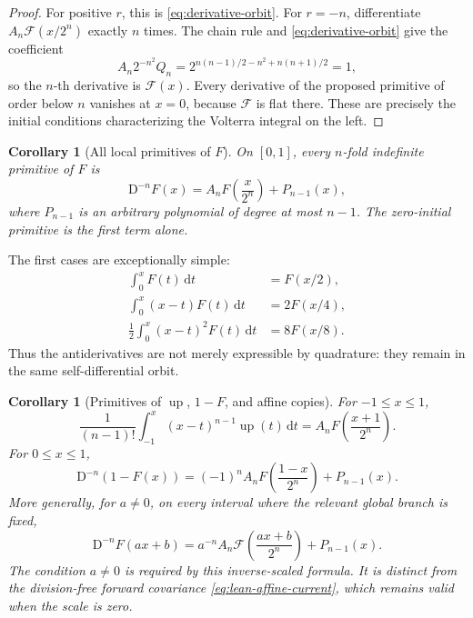 \documentclass[11pt]{article}
\newtheorem{corollary}[theorem]{Corollary}
\theoremstyle{definition}
\theoremstyle{remark}
\DeclareMathOperator{\upf}{up}
\newcommand{\dd}{\,\mathrm d}
\newcommand{\FF}{\mathscr F}
\begin{document}
\begin{proof}
For positive \(r\), this is \eqref{eq:derivative-orbit}.  For \(r=-n\), differentiate
\(A_n\FF(x/2^n)\) exactly \(n\) times.  The chain rule and
\eqref{eq:derivative-orbit} give the coefficient
\[
 A_n2^{-n^2}Q_n
 =2^{n(n-1)/2-n^2+n(n+1)/2}=1,
\]
so the \(n\)-th derivative is \(\FF(x)\).  Every derivative of the proposed primitive
of order below \(n\) vanishes at \(x=0\), because \(\FF\) is flat there.  These are
precisely the initial conditions characterizing the Volterra integral on the left.
\end{proof}

\begin{corollary}[All local primitives of \(F\)]
\label{cor:F-primitives}
On \([0,1]\), every \(n\)-fold indefinite primitive of \(F\) is
\begin{equation}
 \mathrm D^{-n}F(x)=A_nF\!\left(\frac{x}{2^n}\right)+P_{n-1}(x), \label{eq:F-nprimitive}
\end{equation}
where \(P_{n-1}\) is an arbitrary polynomial of degree at most \(n-1\).  The
zero-initial primitive is the first term alone.
\end{corollary}

The first cases are exceptionally simple:
\begin{align}
 \int_0^xF(t)\dd t&=F(x/2),                                      \label{eq:F-first-primitive}\\
 \int_0^x(x-t)F(t)\dd t&=2F(x/4),                                \\
 \frac12\int_0^x(x-t)^2F(t)\dd t&=8F(x/8).
\end{align}
Thus the antiderivatives are not merely expressible by quadrature: they remain in the
same self-differential orbit.

\begin{corollary}[Primitives of \(\upf\), \(1-F\), and affine copies]
\label{cor:other-primitives}
For \(-1\le x\le1\),
\begin{equation}
 \frac1{(n-1)!}\int_{-1}^x(x-t)^{n-1}\upf(t)\dd t
 =A_nF\!\left(\frac{x+1}{2^n}\right).                    \label{eq:up-local-primitive}
\end{equation}
For \(0\le x\le1\),
\begin{equation}
 \mathrm D^{-n}(1-F(x))
 =(-1)^nA_nF\!\left(\frac{1-x}{2^n}\right)+P_{n-1}(x).   \label{eq:one-minus-F}
\end{equation}
More generally, for \(a\ne0\), on every interval where the relevant global branch is fixed,
\begin{equation}
 \mathrm D^{-n}F(ax+b)
 =a^{-n}A_n\FF\!\left(\frac{ax+b}{2^n}\right)+P_{n-1}(x). \label{eq:affine-primitive}
\end{equation}
The condition \(a\ne0\) is required by this inverse-scaled formula.  It is distinct from the
division-free forward covariance \eqref{eq:lean-affine-current}, which remains valid when the
scale is zero.
\end{corollary}
\end{document}
